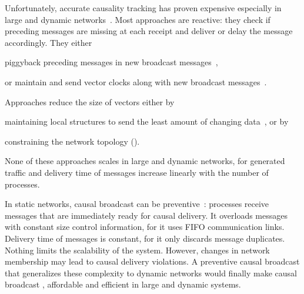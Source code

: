 Unfortunately, accurate causality tracking has proven expensive especially in
large and dynamic networks~\cite{charronbost1991concerning}. Most approaches are
reactive: they check if preceding messages are missing at each receipt and
deliver or delay the message accordingly. They either
\begin{inparaenum}[(i)]
\item piggyback preceding messages in new broadcast
  messages~\cite{birman1987reliable,hadzilacos1993fault},
\item or maintain and send vector clocks along with new broadcast
  messages~\cite{fidge1988timestamps,mattern1989virtual}.
\end{inparaenum}
Approaches reduce the size of vectors either by
\begin{inparaenum}[(a)]
\item maintaining local structures to send the least amount of changing
  data~\cite{singhal1992efficient}, or by
\item constraining the network topology (\REF).
\end{inparaenum}
None of these approaches scales in large and dynamic networks, for
generated traffic and delivery time of messages increase linearly with the
number of processes.

In static networks, causal broadcast can be
preventive~\cite{friedman2004causal}: processes receive messages that are
immediately ready for causal delivery. It overloads messages with constant size
control information, for it uses FIFO communication links. Delivery time of
messages is constant, for it only discards message duplicates. Nothing limits
the scalability of the system.
However, changes in network membership may lead to causal delivery violations. A
preventive causal broadcast that generalizes these complexity to dynamic
networks would finally make causal broadcast , affordable and
efficient in large and dynamic systems.

